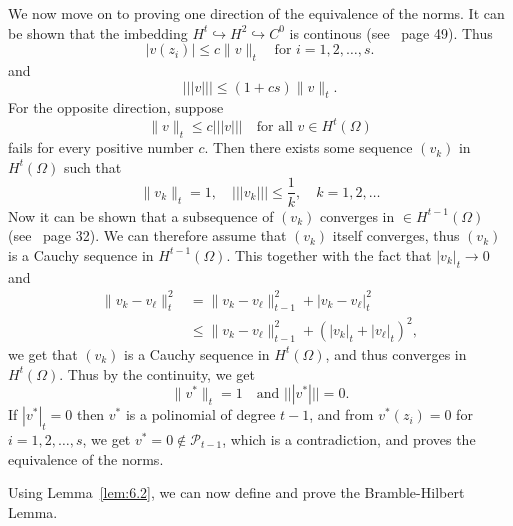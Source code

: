 \begin{bev}
We now move on to proving one direction of the equivalence of the norms. 
It can be shown that the imbedding $H^t\hookrightarrow H^2 \hookrightarrow C^0$ is continous (see~\cite{Braess} page 49). Thus
\begin{equation*}
    |v(z_i)|\leq c\|v\|_t\quad \text{for } i=1,2,\ldots,s.
\end{equation*} 
and
\begin{equation*}
    |||v|||\leq (1+cs)\|v\|_t.
\end{equation*}
For the opposite direction, suppose 
\begin{equation*}
    \|v\|_t\leq c|||v|||\quad \text{for all } v\in H^t(\Omega)
\end{equation*}
fails for every positive number $c$. Then there exists some sequence $(v_k)$ in $H^t(\Omega)$ such that
\begin{equation*}
    \|v_k\|_t=1,\quad |||v_k|||\leq \frac{1}{k},\quad k=1,2,\ldots
\end{equation*}
Now it can be shown that a subsequence of $(v_k)$ converges in $\in H^{t-1}(\Omega)$ (see~\cite{Braess} page 32). We can therefore assume that $(v_k)$ itself converges, thus $(v_k)$ is a Cauchy sequence in $H^{t-1}(\Omega)$.
This together with the fact that $|v_k|_t\to 0$ and
\begin{align*}
    \|v_k-v_\ell\|_t^2 &= \|v_k-v_\ell\|_{t-1}^2 + |v_k-v_\ell|_t^2 \\
    & \leq\|v_k-v_\ell\|_{t-1}^2 + {(|v_k|_t + |v_\ell|_t)}^2 ,
\end{align*}
 we get that $(v_k)$ is a Cauchy sequence in $H^t(\Omega)$, and thus converges in $H^t(\Omega)$.
Thus by the continuity, we get 
\begin{equation}
    \|v^*\|_t = 1\quad \text{and }|||v^*|||=0. 
\end{equation}
If $|v^*|_t = 0$ then $v^*$ is a polinomial of degree $t-1$, and from $v^*(z_i)=0$ for $i=1,2,\ldots,s$, we get $v^*=0\notin \mathcal{P}_{t-1}$,
which is a contradiction, and proves the equivalence of the norms.
\end{bev}

Using Lemma~\ref{lem:6.2}, we can now define and prove the Bramble-Hilbert Lemma.

